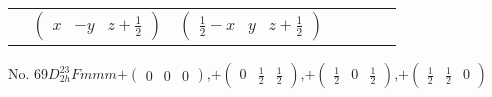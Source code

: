 \documentclass[fleqn,9pt,landscape]{jsarticle}
\begin{document}
\begin{center}
\begin{longtable}{ccccccc}
& $ \begin{pmatrix} x & - y & z + \frac{1}{2} \end{pmatrix} $ & $ \begin{pmatrix} \frac{1}{2} - x & y & z + \frac{1}{2} \end{pmatrix} $ & $  $ & $  $ & $  $ & $  $ \\
\end{longtable}
\end{center}
\newpage
No. 69\quad$D_{2h}^{23}$\quad$Fmmm$\quad[ orthorhombic ]\quad$+\begin{pmatrix} 0 & 0 & 0 \end{pmatrix}$,\quad $+\begin{pmatrix} 0 & \frac{1}{2} & \frac{1}{2} \end{pmatrix}$,\quad $+\begin{pmatrix} \frac{1}{2} & 0 & \frac{1}{2} \end{pmatrix}$,\quad $+\begin{pmatrix} \frac{1}{2} & \frac{1}{2} & 0 \end{pmatrix}$
\end{document}
